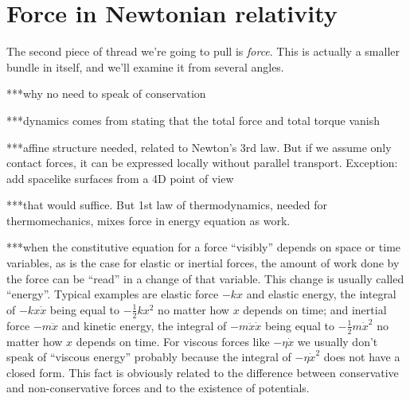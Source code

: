 \documentclass[\ifafour a4paper,12pt,\else a5paper,10pt,\fi%
onecolumn,oneside,article,%
british%
]{memoir}
\theoremstyle{remark}
\theoremstyle{innote}
\renewcommand*{\|}[1][]{\nonscript\,#1\vert\nonscript\;\mathopen{}}
\begin{document}

\section{Force in Newtonian relativity}
\label{sec:force}




The second piece of thread we're going to pull is \emph{force}. This is
actually a smaller bundle in itself, and we'll examine it from several angles.

***why no need to speak of conservation

***dynamics comes from stating that the total force and total torque vanish

***affine structure needed, related to Newton's 3rd law. But if we assume
only contact forces, it can be expressed locally without parallel
transport. Exception: add spacelike surfaces from a 4D point of view

***that would suffice. But 1st law of thermodynamics, needed for
thermomechanics, mixes force in energy equation as work.


***when the constitutive equation for a force \enquote{visibly} depends on
space or time variables, as is the case for elastic or inertial forces, the
amount of work done by the force can be \enquote{read} in a change of that
variable. This change is usually called \enquote{energy}. Typical examples
are elastic force $-kx$ and elastic energy, the integral of $-kx\Dot{x}$
being equal to $-\frac{1}{2}kx^2$ no matter how $x$ depends on time; and
inertial force $-m\ddot{x}$ and kinetic energy, the integral of
$-m\ddot{x}\Dot{x}$ being equal to $-\frac{1}{2}m\Dot{x}^2$ no matter how
$x$ depends on time. For viscous forces like $-\eta\Dot{x}$ we usually
don't speak of \enquote{viscous energy} probably because the integral of
$-\eta\Dot{x}^2$ does not have a closed form. This fact is obviously
related to the difference between conservative and non-conservative forces
and to the existence of potentials.
\end{document}
